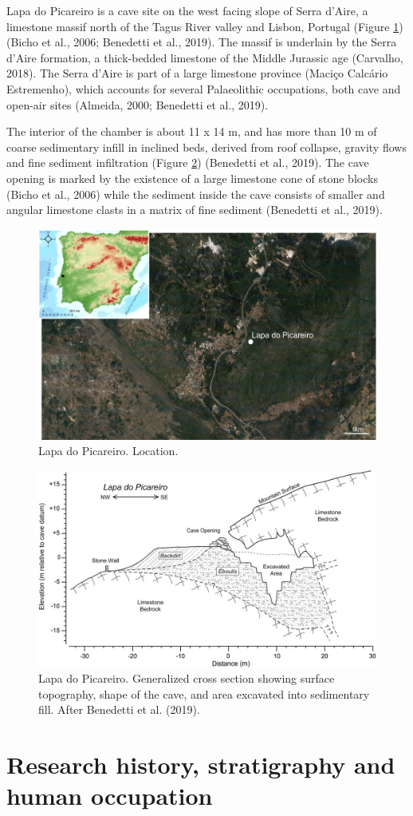 \documentclass[12pt,twoside]{reedthesis}
\begin{document}
Lapa do Picareiro is a cave site on the west facing slope of Serra d'Aire, a limestone massif north of the Tagus River valley and Lisbon, Portugal (Figure \ref{fig:lpmap}) (Bicho et al., 2006; Benedetti et al., 2019). The massif is underlain by the Serra d'Aire formation, a thick-bedded limestone of the Middle Jurassic age (Carvalho, 2018). The Serra d'Aire is part of a large limestone province (Maciço Calcário Estremenho), which accounts for several Palaeolithic occupations, both cave and open-air sites (Almeida, 2000; Benedetti et al., 2019).

The interior of the chamber is about 11 x 14 m, and has more than 10 m of coarse sedimentary infill in inclined beds, derived from roof collapse, gravity flows and fine sediment infiltration (Figure \ref{fig:lpcave}) (Benedetti et al., 2019). The cave opening is marked by the existence of a large limestone cone of stone blocks (Bicho et al., 2006) while the sediment inside the cave consists of smaller and angular limestone clasts in a matrix of fine sediment (Benedetti et al., 2019).
\begin{figure}

{\centering \includegraphics[width=0.6\linewidth]{figure/picareiro_map} 

}

\caption{Lapa do Picareiro. Location.}\label{fig:lpmap}
\end{figure}
\begin{figure}[H]

{\centering \includegraphics[width=0.6\linewidth]{figure/lp_cross_section} 

}

\caption{Lapa do Picareiro. Generalized cross section showing surface topography, shape of the cave, and area excavated into sedimentary fill. After Benedetti et al. (2019).}\label{fig:lpcave}
\end{figure}
\hypertarget{research-history-stratigraphy-and-human-occupation}{%
\section{Research history, stratigraphy and human occupation}\label{research-history-stratigraphy-and-human-occupation}}
\end{document}
